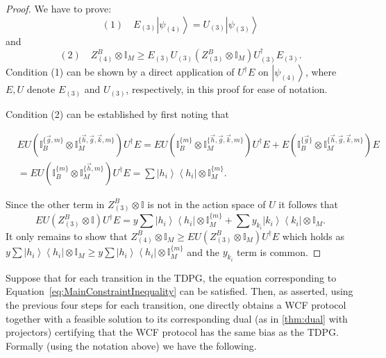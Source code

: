\documentclass{article}
\newcommand{\atul}[1]{#1} %
\begin{document}
\begin{enumerate}
        \begin{proof}
          We have to prove: $$ (1)\quad E_{(3)}\left|\psi_{(4)}\right\rangle =U_{(3)}\left|\psi_{(3)}\right\rangle $$
          and
          $$
          (2)\quad
            Z_{(4)}^{B}\otimes\mathbb{I}_{M}\ge E_{(3)}U_{(3)}\left(Z_{(3)}^{B}\otimes\mathbb{I}_{M}\right)U^\dagger_{(3)}E_{(3)}.
          $$ %
          Condition (1) can be shown by a direct application of $U^{\dagger}E$
          on $\left|\psi_{(4)}\right\rangle $, where $E,U$ denote
          $E_{(3)}$ and $U_{(3)}$, respectively, in this proof for ease of notation.

          Condition (2) can be established by first noting that \begin{footnotesize}
            \begin{align*}
               & EU\left(\mathbb{I}_{B}^{\{\vec{g},m\}}\otimes\mathbb{I}_{M}^{\{\vec{h},\vec{g},\vec{k},m\}}\right)U^{\dagger}E  =EU\left(\mathbb{I}_{B}^{\{m\}}\otimes\mathbb{I}_{M}^{\{\vec{h},\vec{g},\vec{k},m\}}\right)U^{\dagger}E+E\left(\mathbb{I}_{B}^{\{\vec{g}\}}\otimes\mathbb{I}_{M}^{\{\vec{h},\vec{g},\vec{k},m\}}\right)E \\
               & =EU\left(\mathbb{I}_{B}^{\{m\}}\otimes\mathbb{I}_{M}^{\{\vec{h},m\}}\right)U^{\dagger}E=\sum\left|h_{i}\right\rangle \left\langle h_{i}\right|\otimes\mathbb{I}_{M}^{\{m\}}.
            \end{align*}
          \end{footnotesize}
          Since the other term in $Z_{(3)}^{B}\otimes\mathbb{I}$ is not in the action space of $U$ it follows that
          \begin{displaymath}
            EU(Z_{(3)}^{B}\otimes\mathbb{I})U^{\dagger}E=y\sum\left|h_{i}\right\rangle \left\langle h_{i}\right|\otimes\mathbb{I}_{M}^{\{m\}}+\sum y_{k_{i}}\left|k_{i}\right\rangle \left\langle k_{i}\right|\otimes\mathbb{I}_{M}.
          \end{displaymath}
          It only remains to show that $Z_{(4)}^{B}\otimes\mathbb{I}_{M}\ge EU\left(Z_{(3)}^{B}\otimes\mathbb{I}_{M}\right)U^\dagger E$
          which holds as $y\sum\left|h_{i}\right\rangle \left\langle h_{i}\right|\otimes\mathbb{I}_{M}\ge y\sum\left|h_{i}\right\rangle \left\langle h_{i}\right|\otimes\mathbb{I}_{M}^{\{m\}}$
          and the $y_{k_{i}}$ term is common.
        \end{proof}
\end{enumerate}


Suppose that for each transition in the TDPG, the equation corresponding to Equation~\eqref{eq:MainConstraintInequality} can be satisfied. Then, as asserted, using the previous four steps for each transition, one directly obtains a \atul{
  WCF protocol together with a feasible solution to its corresponding dual (as in \cref{thm:dual} with projectors) certifying that the WCF protocol has the same bias as the TDPG. Formally (using the notation above) we have the following.}
%
\end{document}
